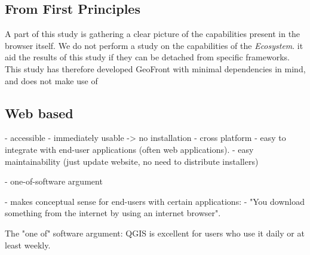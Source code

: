 



\subsection{ From First Principles }
A part of this study is gathering a clear picture of the capabilities present in the browser itself. We do not perform a study on the capabilities of the \emph{Ecosystem}. it aid the results of this study if they can be detached from specific frameworks.
This study has therefore developed GeoFront with minimal dependencies in mind, and does not make use of 


\subsection{ Web based }

- accessible
    - immediately usable -> no installation
    - cross platform
    - easy to integrate with end-user applications (often web applications).
    - easy maintainability (just update website, no need to distribute installers)

- one-of-software argument

- makes conceptual sense for end-users with certain applications: 
  - "You download something from the internet by using an internet browser".

The "one of" software argument: QGIS is excellent for users who use it daily or at least weekly. 


